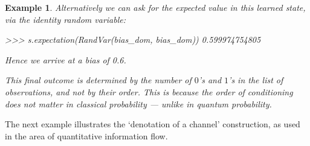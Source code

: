 \documentclass[leqno]{tufte-book} %
\newtheorem{example}[theorem]{Example}
\begin{document}
\begin{example}
\noindent Alternatively we can ask for the expected value in
this learned state, via the identity random variable:
\begin{python}
>>> s.expectation(RandVar(bias_dom, bias_dom))
0.599974754805
\end{python}

\noindent Hence we arrive at a bias of 0.6. 

This final outcome is determined by the number of $0$'s and $1$'s in
the list of observations, and not by their order. This is because the
order of conditioning does not matter in classical probability ---
unlike in quantum probability.
\end{example}



The next example illustrates the `denotation of a channel'
construction, as used in the area of quantitative information flow.
\end{document}
